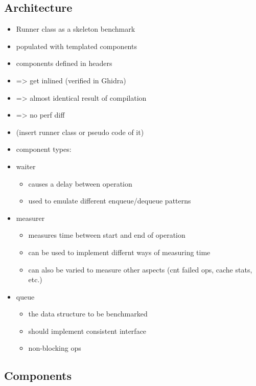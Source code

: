 \subsection{Architecture}
\begin{itemize}
    \item Runner class as a skeleton benchmark
    \item populated with templated components
    \item components defined in headers
    \item => get inlined (verified in Ghidra)
    \item => almost identical result of compilation
    \item => no perf diff
    \item (insert runner class or pseudo code of it)
    \item component types:
    \item waiter
        \begin{itemize}
            \item causes a delay between operation
            \item used to emulate different enqueue/dequeue patterns
        \end{itemize}
    \item measurer
        \begin{itemize}
            \item measures time between start and end of operation
            \item can be used to implement differnt ways of measuring time
            \item can also be varied to measure other aspects (cnt failed ops, cache stats, etc.)
        \end{itemize}
    \item queue
        \begin{itemize}
            \item the data structure to be benchmarked
            \item should implement consistent interface
            \item non-blocking ops
        \end{itemize}
\end{itemize}

\subsection{Components}

